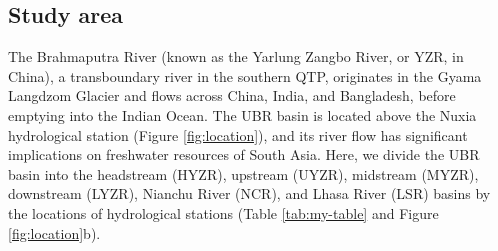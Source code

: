 \documentclass[hess, manuscript]{copernicus}
\begin{document}
\subsection{Study area}
The Brahmaputra River (known as the Yarlung Zangbo River, or YZR, in China), a transboundary river in the southern QTP, originates in the Gyama Langdzom Glacier and flows across China, India, and Bangladesh, before emptying into the Indian Ocean. The UBR basin is located above the Nuxia hydrological station (Figure \ref{fig:location}), and its river flow has significant implications on freshwater resources of South Asia. Here, we divide the UBR basin into the headstream (HYZR), upstream (UYZR), midstream (MYZR), downstream (LYZR), Nianchu River (NCR), and Lhasa River (LSR) basins by the locations of hydrological stations (Table \ref{tab:my-table} and Figure \ref{fig:location}b).
\end{document}
